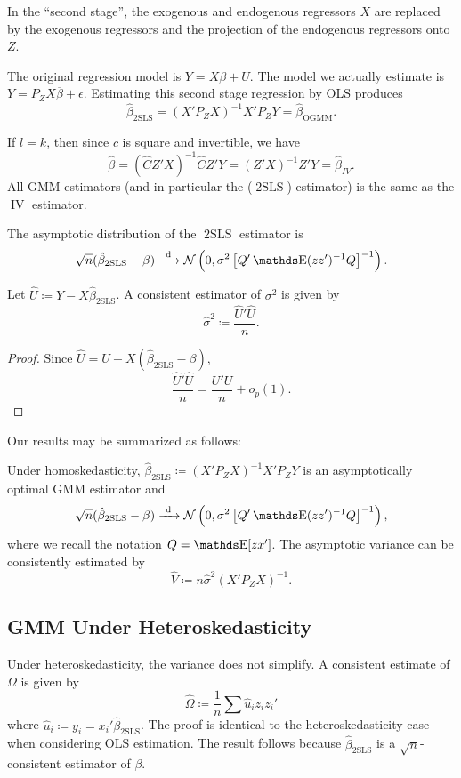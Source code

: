 \documentclass[letterpaper, 10pt]{article}
\DeclareMathOperator{\IV}{IV}
\DeclareMathOperator{\OGMM}{OGMM}
\DeclareMathOperator{\TSLS}{2SLS}
\begin{document}
In the ``second stage'', the exogenous and endogenous regressors \(X\) are replaced by the exogenous regressors and the projection of the endogenous regressors onto \(Z\).

The original regression model is \(Y = X \beta + U\).
The model we actually estimate is  \(Y = P_Z X \overline{\beta} + \epsilon\).
Estimating this second stage regression by OLS produces
\[
  \hat{\beta}_{\TSLS}
  = (X' P_Z X)^{-1} X' P_Z Y
  = \hat{\beta}_{\OGMM}.
\]
\begin{remark}
  If \(l = k\), then since \(c\) is square and invertible, we have
  \[
    \hat{\beta} = (\hat{C} Z' X)^{-1} \hat{C} Z' Y
    = (Z' X)^{-1} Z' Y
    = \hat{\beta}_{IV}.
  \]
  All GMM estimators (and in particular the (\(\TSLS\)) estimator) is the same as the \(\IV\) estimator.
\end{remark}

The asymptotic distribution of the \(\TSLS\) estimator is
\[
  \sqrt{n} (\hat{\beta}_{\TSLS} - \beta)
  \longdistto \Normal\left( 0, \sigma^2 \left[ Q' \E(zz')^{-1} Q \right]^{-1} \right).
\]

\begin{proposition}
  Let \(\hat{U} \coloneqq Y - X \hat{\beta}_{\TSLS}\).
  A consistent estimator of \(\sigma^2\) is given by
  \[
    \hat{\sigma}^2
    \coloneqq \frac{\hat{U}' \hat{U}}{n}.
  \]
\end{proposition}
\begin{proof}
  Since \(\hat{U} = U - X (\hat{\beta}_{\TSLS} - \beta)\),
  \[
    \frac{\hat{U}' \hat{U}}{n}
    = \frac{U' U}{n} + o_p(1).
  \]
\end{proof}

Our results may be summarized as follows:
\begin{proposition}
  Under homoskedasticity, \(\hat{\beta}_{\TSLS} \coloneqq (X' P_Z X)^{-1} X' P_Z Y\) is an asymptotically optimal GMM estimator and 
  \[
    \sqrt{n} (\hat{\beta}_{\TSLS} - \beta)
    \longdistto \Normal\left( 0, \sigma^2 \left[ Q' \E(zz')^{-1} Q \right]^{-1} \right),
  \]
  where we recall the notation \(Q = \E[zx']\).
  The asymptotic variance can be consistently estimated by
  \[
    \hat{V}
    \coloneqq n \hat{\sigma}^2 (X' P_Z X)^{-1}.
  \]
\end{proposition}

 
\subsection{GMM Under Heteroskedasticity}
Under heteroskedasticity, the variance does not simplify.
A consistent estimate of \(\Omega\) is given by
\[
  \hat{\Omega}
  \coloneqq \frac{1}{n} \sum \hat{u}_i z_i z_i'
\]
where \(\hat{u}_i \coloneqq y_i = x_i' \hat{\beta}_{\TSLS}\).
The proof is identical to the heteroskedasticity case when considering OLS estimation.
The result follows because \(\hat{\beta}_{\TSLS}\) is a \(\sqrt{n}\)-consistent estimator of \(\beta\).
\end{document}
